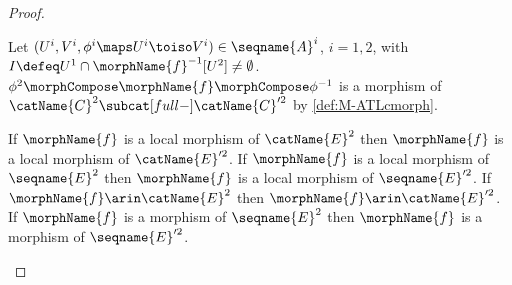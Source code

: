 \documentclass{article}
\begin{document}
\begin{lemma}
\begin{proof}
\begin{description}
Let $(U^i, V^i, \phi^i \maps U^i \toiso V^i) \in \seqname{A}^i$, $i=1,2$,
with $I \defeq U^1 \cap \morphName{f}^{-1}[U^2] \neq \emptyset$.
$\phi^2 \morphCompose \morphName{f} \morphCompose \phi^{-1}$ is a morphism of
$\catName{C}^2 \subcat[full-] \catName{C}'^2$ by \cref{def:M-ATLcmorph}.
\item[$\morphName{f}$ remains semi-strict (strict).]
If $\morphName{f}$ is a local morphism of $\catName{E}^2$ then
$\morphName{f}$ is a local morphism of $\catName{E}'^2$.    If
$\morphName{f}$ is a local morphism of $\seqname{E}^2$ then
$\morphName{f}$ is a local morphism of $\seqname{E}'^2$.    If
$\morphName{f} \arin \catName{E}^2$ then
$\morphName{f} \arin \catName{E}'^2$.  If $\morphName{f}$ is a
morphism of $\seqname{E}^2$ then $\morphName{f}$ is a morphism of
$\seqname{E}'^2$.
\end{description}
\end{proof}
\end{lemma}
\end{document}
